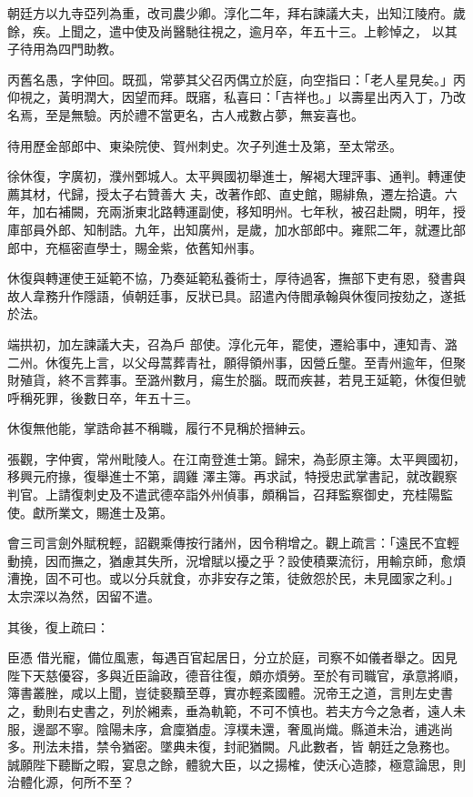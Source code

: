 \begin{pinyinscope}
 朝廷方以九寺亞列為重，改司農少卿。淳化二年，拜右諫議大夫，出知江陵府。歲餘，疾。上聞之，遣中使及尚醫馳往視之，逾月卒，年五十三。上軫悼之，
 以其子待用為四門助教。



 丙舊名愚，字仲回。既孤，常夢其父召丙偶立於庭，向空指曰：「老人星見矣。」丙仰視之，黃明潤大，因望而拜。既寤，私喜曰：「吉祥也。」以壽星出丙入丁，乃改名焉，至是無驗。丙於禮不當更名，古人戒數占夢，無妄喜也。



 待用歷金部郎中、東染院使、賀州刺史。次子列進士及第，至太常丞。



 徐休復，字廣初，濮州鄄城人。太平興國初舉進士，解褐大理評事、通判。轉運使薦其材，代歸，授太子右贊善大
 夫，改著作郎、直史館，賜緋魚，遷左拾遺。六年，加右補闕，充兩浙東北路轉運副使，移知明州。七年秋，被召赴闕，明年，授庫部員外郎、知制誥。九年，出知廣州，是歲，加水部郎中。雍熙二年，就遷比部郎中，充樞密直學士，賜金紫，依舊知州事。



 休復與轉運使王延範不協，乃奏延範私養術士，厚待過客，撫部下吏有恩，發書與故人韋務升作隱語，偵朝廷事，反狀已具。詔遣內侍閻承翰與休復同按劾之，遂抵於法。



 端拱初，加左諫議大夫，召為戶
 部使。淳化元年，罷使，遷給事中，連知青、潞二州。休復先上言，以父母蒿葬青社，願得領州事，因營丘壟。至青州逾年，但聚財殖貨，終不言葬事。至潞州數月，瘍生於腦。既而疾甚，若見王延範，休復但號呼稱死罪，後數日卒，年五十三。



 休復無他能，掌誥命甚不稱職，履行不見稱於搢紳云。



 張觀，字仲賓，常州毗陵人。在江南登進士第。歸宋，為彭原主簿。太平興國初，移興元府掾，復舉進士不第，調雞
 澤主簿。再求試，特授忠武掌書記，就改觀察判官。上請復刺史及不遣武德卒詣外州偵事，頗稱旨，召拜監察御史，充桂陽監使。獻所業文，賜進士及第。



 會三司言劍外賦稅輕，詔觀乘傳按行諸州，因令稍增之。觀上疏言：「遠民不宜輕動撓，因而撫之，猶慮其失所，況增賦以擾之乎？設使積粟流衍，用輸京師，愈煩漕挽，固不可也。或以分兵就食，亦非安存之策，徒斂怨於民，未見國家之利。」太宗深以為然，因留不遣。



 其後，復上疏曰：



 臣憑
 借光寵，備位風憲，每遇百官起居日，分立於庭，司察不如儀者舉之。因見陛下天慈優容，多與近臣論政，德音往復，頗亦煩勞。至於有司職官，承意將順，簿書叢脞，咸以上聞，豈徒褻黷至尊，實亦輕紊國體。況帝王之道，言則左史書之，動則右史書之，列於緗素，垂為軌範，不可不慎也。若夫方今之急者，遠人未服，邊鄙不寧。陰陽未序，倉廩猶虛。淳樸未還，奢風尚熾。縣道未治，逋逃尚多。刑法未措，禁令猶密。墜典未復，封祀猶闕。凡此數者，皆
 朝廷之急務也。誠願陛下聽斷之暇，宴息之餘，體貌大臣，以之揚榷，使沃心造膝，極意論思，則治體化源，何所不至？




\end{pinyinscope}
